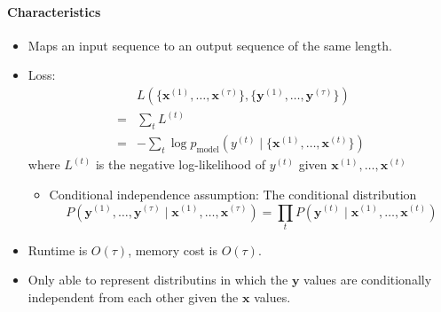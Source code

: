 \documentclass[12pt, a4paper]{article}
\def\vx{\boldsymbol{x}}
\def\vy{\boldsymbol{y}}
\newcommand{\egvx}[1]{\boldsymbol{x}^{(#1)}}
\newcommand{\egvy}[1]{\boldsymbol{y}^{(#1)}}
\newcommand{\egy}[1]{y^{(#1)}}
\newcommand{\egL}[1]{L^{(#1)}}
\begin{document}
\paragraph{Characteristics}
\begin{itemize}
    \item Maps an input sequence to an output sequence of the same length.
    \item{
        Loss:
        \begin{equation}
            \begin{split}
                & L\left( \{\egvx{1},\dots,\egvx{\tau}\}, \{\egvy{1},\dots,\egvy{\tau}\} \right)
                \\=& \sum_t \egL{t}
                \\=& - \sum_t \log p_\text{model} \left( \egy{t} \mid \{\egvx{1},\dots,\egvx{t}\} \right)
            \end{split}
            \label{rnn_loss}
        \end{equation}
        where $\egL{t}$ is the negative log-likelihood of $\egy{t}$ given $\egvx{1},\dots,\egvx{t}$
        \begin{itemize}
            \item{
                Conditional independence assumption: The conditional distribution 
                \[
                    P( \egvy{1},\dots,\egvy{\tau} \mid \egvx{1},\dots,\egvx{\tau} ) = 
                    \prod_t P(\egvy{t} \mid \egvx{1},\dots,\egvx{t})
                \]
            }
        \end{itemize}
    }
    \item Runtime is $O(\tau)$, memory cost is $O(\tau)$.
    \item Only able to represent distributins in which the $\vy$ values are conditionally independent from each other given the $\vx$ values.
\end{itemize}
\end{document}
